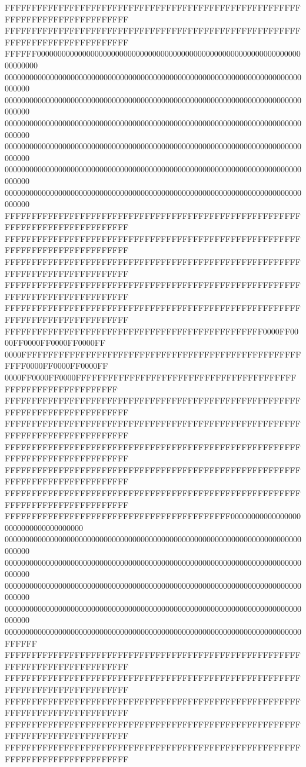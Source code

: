 FFFFFFFFFFFFFFFFFFFFFFFFFFFFFFFFFFFFFFFFFFFFFFFFFFFFFFFFFFFFFFFFFFFFFFFFFFFFFF
FFFFFFFFFFFFFFFFFFFFFFFFFFFFFFFFFFFFFFFFFFFFFFFFFFFFFFFFFFFFFFFFFFFFFFFFFFFFFF
FFFFFF000000000000000000000000000000000000000000000000000000000000000000000000
000000000000000000000000000000000000000000000000000000000000000000000000000000
000000000000000000000000000000000000000000000000000000000000000000000000000000
000000000000000000000000000000000000000000000000000000000000000000000000000000
000000000000000000000000000000000000000000000000000000000000000000000000000000
000000000000000000000000000000000000000000000000000000000000000000000000000000
000000000000000000000000000000000000000000000000000000000000000000000000000000
FFFFFFFFFFFFFFFFFFFFFFFFFFFFFFFFFFFFFFFFFFFFFFFFFFFFFFFFFFFFFFFFFFFFFFFFFFFFFF
FFFFFFFFFFFFFFFFFFFFFFFFFFFFFFFFFFFFFFFFFFFFFFFFFFFFFFFFFFFFFFFFFFFFFFFFFFFFFF
FFFFFFFFFFFFFFFFFFFFFFFFFFFFFFFFFFFFFFFFFFFFFFFFFFFFFFFFFFFFFFFFFFFFFFFFFFFFFF
FFFFFFFFFFFFFFFFFFFFFFFFFFFFFFFFFFFFFFFFFFFFFFFFFFFFFFFFFFFFFFFFFFFFFFFFFFFFFF
FFFFFFFFFFFFFFFFFFFFFFFFFFFFFFFFFFFFFFFFFFFFFFFFFFFFFFFFFFFFFFFFFFFFFFFFFFFFFF
FFFFFFFFFFFFFFFFFFFFFFFFFFFFFFFFFFFFFFFFFFFFFFFF0000FF0000FF0000FF0000FF0000FF
0000FFFFFFFFFFFFFFFFFFFFFFFFFFFFFFFFFFFFFFFFFFFFFFFFFFFFFFFF0000FF0000FF0000FF
0000FF0000FF0000FFFFFFFFFFFFFFFFFFFFFFFFFFFFFFFFFFFFFFFFFFFFFFFFFFFFFFFFFFFFFF
FFFFFFFFFFFFFFFFFFFFFFFFFFFFFFFFFFFFFFFFFFFFFFFFFFFFFFFFFFFFFFFFFFFFFFFFFFFFFF
FFFFFFFFFFFFFFFFFFFFFFFFFFFFFFFFFFFFFFFFFFFFFFFFFFFFFFFFFFFFFFFFFFFFFFFFFFFFFF
FFFFFFFFFFFFFFFFFFFFFFFFFFFFFFFFFFFFFFFFFFFFFFFFFFFFFFFFFFFFFFFFFFFFFFFFFFFFFF
FFFFFFFFFFFFFFFFFFFFFFFFFFFFFFFFFFFFFFFFFFFFFFFFFFFFFFFFFFFFFFFFFFFFFFFFFFFFFF
FFFFFFFFFFFFFFFFFFFFFFFFFFFFFFFFFFFFFFFFFFFFFFFFFFFFFFFFFFFFFFFFFFFFFFFFFFFFFF
FFFFFFFFFFFFFFFFFFFFFFFFFFFFFFFFFFFFFFFFFF000000000000000000000000000000000000
000000000000000000000000000000000000000000000000000000000000000000000000000000
000000000000000000000000000000000000000000000000000000000000000000000000000000
000000000000000000000000000000000000000000000000000000000000000000000000000000
000000000000000000000000000000000000000000000000000000000000000000000000000000
000000000000000000000000000000000000000000000000000000000000000000000000FFFFFF
FFFFFFFFFFFFFFFFFFFFFFFFFFFFFFFFFFFFFFFFFFFFFFFFFFFFFFFFFFFFFFFFFFFFFFFFFFFFFF
FFFFFFFFFFFFFFFFFFFFFFFFFFFFFFFFFFFFFFFFFFFFFFFFFFFFFFFFFFFFFFFFFFFFFFFFFFFFFF
FFFFFFFFFFFFFFFFFFFFFFFFFFFFFFFFFFFFFFFFFFFFFFFFFFFFFFFFFFFFFFFFFFFFFFFFFFFFFF
FFFFFFFFFFFFFFFFFFFFFFFFFFFFFFFFFFFFFFFFFFFFFFFFFFFFFFFFFFFFFFFFFFFFFFFFFFFFFF
FFFFFFFFFFFFFFFFFFFFFFFFFFFFFFFFFFFFFFFFFFFFFFFFFFFFFFFFFFFFFFFFFFFFFFFFFFFFFF
